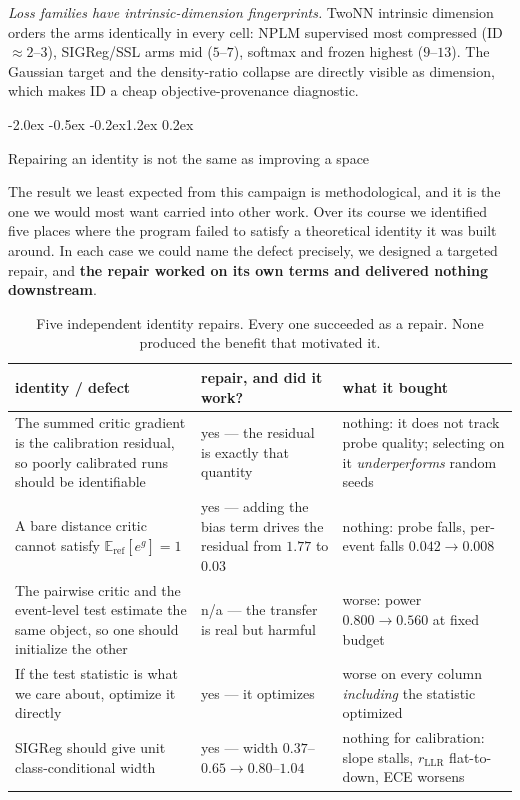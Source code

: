 \documentclass{article}
\makeatletter
\renewcommand\section{\@startsection{section}{1}{\z@}%
  {-2.0ex \@plus -0.5ex \@minus -0.2ex}{1.2ex \@plus 0.2ex}%
  {\large\bf\raggedright}}
\newcommand{\E}{\mathbb{E}}
\makeatother
\begin{document}
\emph{Loss families have intrinsic-dimension fingerprints.} TwoNN intrinsic
dimension orders the arms identically in every cell: NPLM supervised most
compressed (ID $\approx2$--$3$), SIGReg/SSL arms mid ($5$--$7$), softmax and
frozen highest ($9$--$13$). The Gaussian target and the density-ratio collapse
are directly visible as dimension, which makes ID a cheap objective-provenance
diagnostic.

\section{Repairing an identity is not the same as improving a space}
\label{sec:meta}

The result we least expected from this campaign is methodological, and it is
the one we would most want carried into other work. Over its course we
identified five places where the program failed to satisfy a theoretical
identity it was built around. In each case we could name the defect precisely,
we designed a targeted repair, and \textbf{the repair worked on its own terms
and delivered nothing downstream}.

\begin{table}[t]\centering\small
\begin{tabular}{p{}p{}p{}}
\toprule
identity / defect & repair, and did it work? & what it bought \\
\midrule
The summed critic gradient is the calibration residual, so poorly calibrated
runs should be identifiable &
yes --- the residual is exactly that quantity &
nothing: it does not track probe quality; selecting on it \emph{underperforms}
random seeds \\
A bare distance critic cannot satisfy $\E_{\mathrm{ref}}[e^{g}]=1$ &
yes --- adding the bias term drives the residual from $1.77$ to $0.03$ &
nothing: probe falls, per-event falls $0.042\to0.008$ \\
The pairwise critic and the event-level test estimate the same object, so one
should initialize the other &
n/a --- the transfer is real but harmful &
worse: power $0.800\to0.560$ at fixed budget \\
If the test statistic is what we care about, optimize it directly &
yes --- it optimizes &
worse on every column \emph{including} the statistic optimized \\
SIGReg should give unit class-conditional width &
yes --- width $0.37$--$0.65 \to 0.80$--$1.04$ &
nothing for calibration: slope stalls, $r_{\mathrm{LLR}}$ flat-to-down, ECE
worsens \\
\bottomrule
\end{tabular}
\caption{Five independent identity repairs. Every one succeeded as a repair.
None produced the benefit that motivated it.}
\label{tab:meta}
\end{table}
\end{document}
